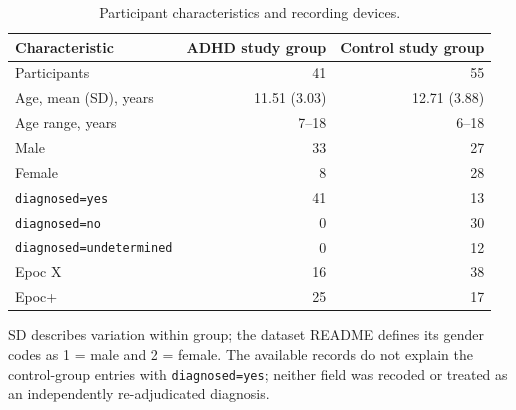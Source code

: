 \begin{table}[!htbp]
\centering\small
\caption{Participant characteristics and recording devices.}
\label{tab:participants}
\setlength{\tabcolsep}{5pt}\renewcommand{\arraystretch}{1.14}
\begin{tabularx}{\textwidth}{@{}>{\raggedright\arraybackslash}Xrr@{}}
\toprule
Characteristic & ADHD study group & Control study group\\
\midrule
Participants & 41 & 55\\
Age, mean (SD), years & 11.51 (3.03) & 12.71 (3.88)\\
Age range, years & 7--18 & 6--18\\
Male & 33 & 27\\
Female & 8 & 28\\
\texttt{diagnosed=yes} & 41 & 13\\
\texttt{diagnosed=no} & 0 & 30\\
\texttt{diagnosed=undetermined} & 0 & 12\\
\midrule
Epoc X & 16 & 38\\
Epoc+ & 25 & 17\\
\bottomrule
\end{tabularx}
\par\smallskip\begin{minipage}{\textwidth}\footnotesize SD describes variation within group; the dataset README defines its gender codes as 1 = male and 2 = female. The available records do not explain the control-group entries with \texttt{diagnosed=yes}; neither field was recoded or treated as an independently re-adjudicated diagnosis.\end{minipage}
\end{table}
